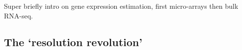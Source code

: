 


Super briefly intro on gene expression estimation, first micro-arrays then bulk RNA-seq.

\subsection{The `resolution revolution'}
\label{sec:scrnaseq}

